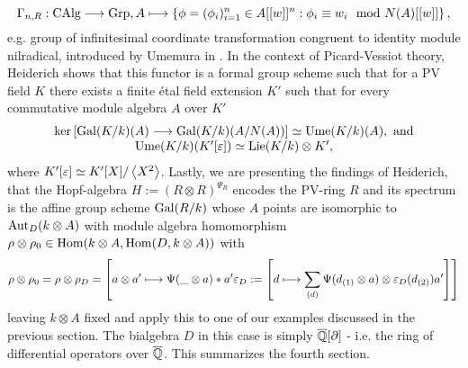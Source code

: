 $$\Gamma_{n,R} : \trm{CAlg} \longrightarrow \trm{Grp}, A \longmapsto \left\{\phi = (\phi_i)_{i=1}^n\in A[[w]]^n : \phi_i \equiv w_i \mod N(A)[[w]]\right\},$$
e.g. group of infinitesimal coordinate transformation congruent to identity module nilradical, introduced by Umemura in \cite{Ume96}. In the context of Picard-Vessiot theory, Heiderich shows that this functor is a formal group scheme such that for a PV field $K$ there exists a finite \'{e}tal field extension $K'$ such that for every commutative module algebra $A$ over $K'$
$$\bao{c}
\ker\left[\trm{Gal}(K/k)(A) \longrightarrow \trm{Gal}(K/k)(A/N(A))\right] \simeq \trm{Ume}(K/k)(A),\ \trm{and}\\ \trm{Ume}(K/k)(K'[\eps]) \simeq \trm{Lie}(K/k) \otimes K',\\\ea$$
where $K'[\eps] \simeq K'[X]/\left<X^2\right>$. Lastly, we are presenting the findings of Heiderich, that the Hopf-algebra $H := (R \otimes R)^{\Psi_R}$ encodes the PV-ring $R$ and its spectrum is the affine group scheme $\trm{Gal}(R/k)$ whose $A$ points are isomorphic to $\trm{Aut}_D(k \otimes A)$ with module algebra homomorphism $\rho \otimes \rho_0 \in \trm{Hom}(k \otimes A, \trm{Hom}(D,k \otimes A))$ with
$$\rho \otimes \rho_0 = \rho \otimes \rho_D = \left[a \otimes a' \longmapsto \Psi(\_\otimes a) \ast a' \eps_D := \left[d \longmapsto \sum_{(d)} \Psi(d_{(1)} \otimes a) \otimes \eps_D(d_{(2)}) a'\right]\right]$$
leaving $k \otimes A$ fixed and apply this to one of our examples discussed in the previous section. The bialgebra $D$ in this case is simply $\currfield[\partial]$ - i.e. the ring of differential operators over $\currfield$. This summarizes the fourth section.\\
